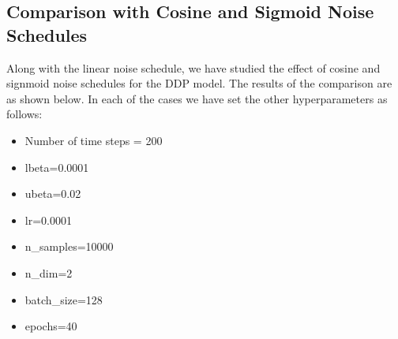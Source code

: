 \documentclass[a4paper,12pt]{article}
\begin{document}
\subsection*{Comparison with Cosine and Sigmoid Noise Schedules}
Along with the linear noise schedule, we have studied the effect of cosine and signmoid noise schedules for the DDP model. The results of the comparison are as shown below. In each of the cases we have set the other hyperparameters as follows:
\begin{itemize}
  \item Number of time steps = 200
  \item lbeta=0.0001
  \item ubeta=0.02
  \item lr=0.0001
  \item n\_samples=10000
  \item n\_dim=2
  \item batch\_size=128
  \item epochs=40
\end{itemize}
\end{document}
